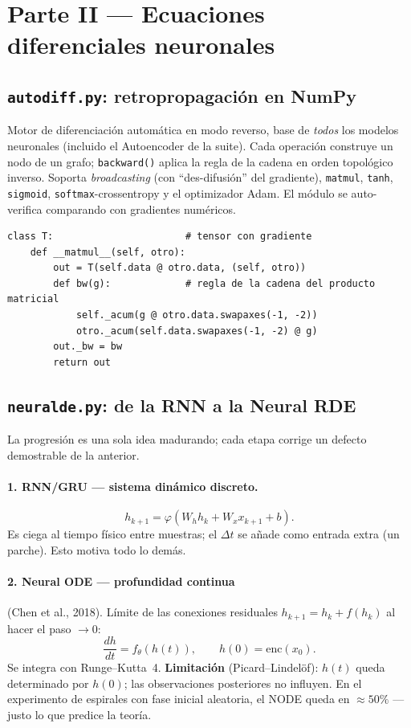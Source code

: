 \documentclass[11pt,a4paper]{article}
\begin{document}
\section{Parte II — Ecuaciones diferenciales neuronales}

\subsection{\texttt{autodiff.py}: retropropagación en NumPy}

Motor de diferenciación automática en modo reverso, base de \emph{todos} los
modelos neuronales (incluido el Autoencoder de la suite). Cada operación
construye un nodo de un grafo; \texttt{backward()} aplica la regla de la cadena
en orden topológico inverso. Soporta \emph{broadcasting} (con
``des-difusión'' del gradiente), \texttt{matmul}, \texttt{tanh},
\texttt{sigmoid}, \texttt{softmax}-crossentropy y el optimizador Adam.
El módulo se auto-verifica comparando con gradientes numéricos.

\begin{lstlisting}
class T:                       # tensor con gradiente
    def __matmul__(self, otro):
        out = T(self.data @ otro.data, (self, otro))
        def bw(g):             # regla de la cadena del producto matricial
            self._acum(g @ otro.data.swapaxes(-1, -2))
            otro._acum(self.data.swapaxes(-1, -2) @ g)
        out._bw = bw
        return out
\end{lstlisting}

\subsection{\texttt{neuralde.py}: de la RNN a la Neural RDE}

La progresión es una sola idea madurando; cada etapa corrige un defecto
demostrable de la anterior.

\paragraph{1. RNN/GRU --- sistema dinámico discreto.}
\[ h_{k+1} = \varphi(W_h h_k + W_x x_{k+1} + b). \]
Es ciega al tiempo físico entre muestras; el $\Delta t$ se añade como entrada
extra (un parche). Esto motiva todo lo demás.

\paragraph{2. Neural ODE --- profundidad continua} (Chen et al., 2018).
Límite de las conexiones residuales $h_{k+1}=h_k+f(h_k)$ al hacer el paso $\to0$:
\[ \frac{dh}{dt}=f_\theta(h(t)),\qquad h(0)=\mathrm{enc}(x_0). \]
Se integra con Runge--Kutta~4. \textbf{Limitación} (Picard--Lindelöf): $h(t)$
queda determinado por $h(0)$; las observaciones posteriores no influyen. En el
experimento de espirales con fase inicial aleatoria, el NODE queda en
$\approx 50\%$ ---justo lo que predice la teoría.
\end{document}
